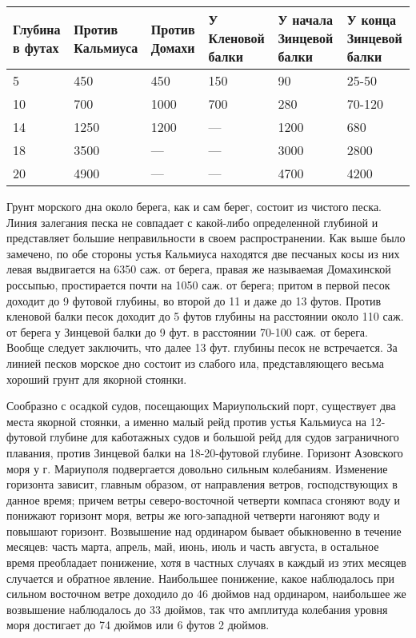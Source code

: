 \begin{center}
\begin{longtable}{|p{2cm}|p{2.5cm}|p{2.5cm}|p{2cm}|p{2cm}|p{2.5cm}|}
\hline
\textbf{Глубина в футах} &	\textbf{Против Кальмиуса} &	\textbf{Против Домахи} &	\textbf{У Кленовой балки} &	\textbf{У начала Зинцевой балки} &	\textbf{У конца Зинцевой балки} \\
\hline
5  & 450  & 450  & 150 & 90   & 25-50  \\
\hline
10 & 700  & 1000 & 700 & 280  & 70-120 \\
\hline
14 & 1250 & 1200 & —   & 1200 & 680    \\
\hline
18 & 3500 & —    & —   & 3000 & 2800   \\
\hline
20 & 4900 & —    & —   & 4700 & 4200   \\
\hline
\end{longtable}
	
\end{center}

Грунт морского дна около берега, как и сам берег, состоит из чистого песка.
Линия залегания песка не совпадает с какой-либо определенной глубиной и
представляет большие неправильности в своем распространении. Как выше было
замечено, по обе стороны устья Кальмиуса находятся две песчаных косы из них
левая выдвигается на 6350 саж. от берега, правая же называемая Домахинской
россыпью, простирается почти на 1050 саж. от берега; притом в первой песок
доходит до 9 футовой глубины, во второй до 11 и даже до 13 футов. Против
кленовой балки песок доходит до 5 футов глубины на расстоянии около 110 саж. от
берега у Зинцевой балки до 9 фут. в расстоянии 70-100 саж. от берега. Вообще
следует заключить, что далее 13 фут. глубины песок не встречается. За линией
песков морское дно состоит из слабого ила, представляющего весьма хороший грунт
для якорной стоянки.

Сообразно с осадкой судов, посещающих Мариупольский порт, существует два места
якорной стоянки, а именно малый рейд против устья Кальмиуса на 12-футовой
глубине для каботажных судов и большой рейд для судов заграничного плавания,
против Зинцевой балки на 18-20-футовой глубине. Горизонт Азовского моря у г.
Мариуполя подвергается довольно сильным колебаниям. Изменение горизонта
зависит, главным образом, от направления ветров, господствующих в данное время;
причем ветры северо-восточной четверти компаса сгоняют воду и понижают горизонт
моря, ветры же юго-западной четверти нагоняют воду и повышают горизонт.
Возвышение над ординаром бывает обыкновенно в течение месяцев: часть марта,
апрель, май, июнь, июль и часть августа, в остальное время преобладает
понижение, хотя в частных случаях в каждый из этих месяцев случается и обратное
явление. Наибольшее понижение, какое наблюдалось при сильном восточном ветре
доходило до 46 дюймов над ординаром, наибольшее же возвышение наблюдалось до 33
дюймов, так что амплитуда колебания уровня моря достигает до 74 дюймов или 6
футов 2 дюймов.

